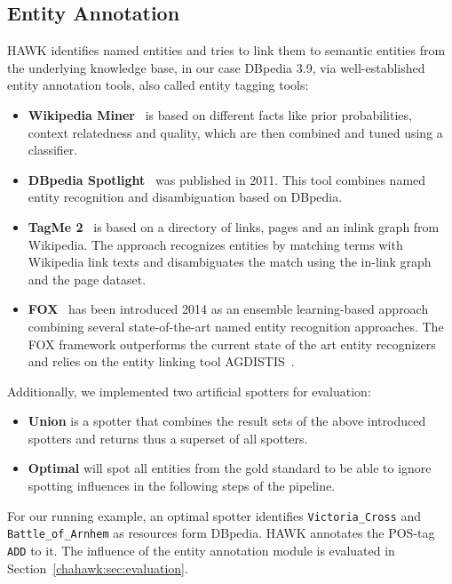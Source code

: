 \subsection{Entity Annotation}
HAWK identifies named entities and tries to link them to semantic entities from the underlying knowledge base, in our case DBpedia 3.9, via well-established entity annotation tools, also called entity tagging tools:
\begin{itemize}
\item \textbf{Wikipedia Miner}~\cite{milne2008learning} is based on different facts like prior probabilities, context relatedness and quality, which are then combined and tuned using a classifier.
\item \textbf{DBpedia Spotlight}~\cite{spotlight} %
was published in 2011. 
This tool combines named entity recognition and disambiguation based on DBpedia.
\item \textbf{TagMe 2}~\cite{TagMe2} is based on a directory of links, pages and an inlink graph from Wikipedia.
The approach recognizes entities by matching terms with Wikipedia link texts and disambiguates the match using the in-link graph and the page dataset.
\item \textbf{FOX}~\cite{FOX} has been introduced 2014 as an ensemble learning-based approach combining several state-of-the-art named entity recognition approaches. 
The FOX framework outperforms the current state of the art entity recognizers and relies on the entity linking tool AGDISTIS~\cite{AGDISTIS_ISWC}.
\end{itemize}
Additionally, we implemented two artificial spotters for evaluation:
\begin{itemize}
\item \textbf{Union} is a spotter that combines the result sets of the above introduced spotters and returns thus a superset of all spotters.
\item \textbf{Optimal} will spot all entities from the gold standard to be able to ignore spotting influences in the following steps of the pipeline.
\end{itemize}

For our running example, an optimal spotter identifies \texttt{Victoria\_Cross} and \texttt{Battle\_of\_Arnhem} as resources form DBpedia.
HAWK annotates the POS-tag \texttt{ADD} to it. %
The influence of the entity annotation module is evaluated in Section~\ref{chahawk:sec:evaluation}.

